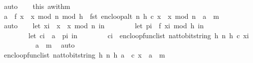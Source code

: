\begin{isabellebody}
\ auto\isanewline
\isanewline
\ \ \isamarkupfalse%
\ this\ a{\isacharunderscore}{\kern0pt}with{\isacharunderscore}{\kern0pt}m\ \isanewline
\ \ \isamarkupfalse%
\ {\isachardoublequoteopen}{\isacharquery}{\kern0pt}a{\isacharprime}{\kern0pt}\ {\isacharbrackleft}{\kern0pt}{\isasymoplus}{\isacharbrackright}{\kern0pt}\ {\isacharquery}{\kern0pt}f\ {\isacharparenleft}{\kern0pt}x\ {\isacharasterisk}{\kern0pt}\ x\ mod\ n\ mod\ {}{\isacharcircum}{\kern0pt}h{\isacharparenright}{\kern0pt}\ {\isacharhash}{\kern0pt}\ fst\ {\isacharparenleft}{\kern0pt}enc{\isacharunderscore}{\kern0pt}loop{\isacharunderscore}{\kern0pt}alt\ {\isacharparenleft}{\kern0pt}n{\isacharcomma}{\kern0pt}\ h{\isacharcomma}{\kern0pt}\ c{\isacharprime}{\kern0pt}{\isacharparenright}{\kern0pt}\ {\isacharparenleft}{\kern0pt}x\ {\isacharasterisk}{\kern0pt}\ x\ mod\ n{\isacharparenright}{\kern0pt}{\isacharparenright}{\kern0pt}\ {\isacharequal}{\kern0pt}\ a\ {\isacharhash}{\kern0pt}\ m{\isachardoublequoteclose}\isanewline
\ \ \ \ \isamarkupfalse%
\ auto\isanewline
\isanewline
\ \ \isamarkupfalse%
\ {\isachardoublequoteopen}{\isacharparenleft}{\kern0pt}let\ x{\isacharunderscore}{\kern0pt}i\ {\isacharequal}{\kern0pt}\ x\ {\isacharasterisk}{\kern0pt}\ x\ mod\ n\ in\isanewline
\ \ \ \ \ \ \ \ let\ p{\isacharunderscore}{\kern0pt}i\ {\isacharequal}{\kern0pt}\ {\isacharquery}{\kern0pt}f\ {\isacharparenleft}{\kern0pt}x{\isacharunderscore}{\kern0pt}i\ mod\ {}{\isacharcircum}{\kern0pt}h{\isacharparenright}{\kern0pt}\ in\isanewline
\ \ \ \ \ \ \ \ let\ c{\isacharunderscore}{\kern0pt}i\ {\isacharequal}{\kern0pt}\ {\isacharquery}{\kern0pt}a{\isacharprime}{\kern0pt}\ {\isacharbrackleft}{\kern0pt}{\isasymoplus}{\isacharbrackright}{\kern0pt}\ p{\isacharunderscore}{\kern0pt}i\ in\isanewline
\ \ \ \ \ \ \ \ c{\isacharunderscore}{\kern0pt}i\ {\isacharhash}{\kern0pt}\ enc{\isacharunderscore}{\kern0pt}loop{\isacharunderscore}{\kern0pt}func{\isacharunderscore}{\kern0pt}list\ {\isacharparenleft}{\kern0pt}nat{\isacharunderscore}{\kern0pt}to{\isacharunderscore}{\kern0pt}bitstring\ h{\isacharcomma}{\kern0pt}\ n{\isacharcomma}{\kern0pt}\ h{\isacharcomma}{\kern0pt}\ c{\isacharprime}{\kern0pt}{\isacharparenright}{\kern0pt}\ x{\isacharunderscore}{\kern0pt}i\isanewline
\ \ \ \ \ \ \ \ {\isacharparenright}{\kern0pt}\ {\isacharequal}{\kern0pt}\ a\ {\isacharhash}{\kern0pt}\ m{\isachardoublequoteclose}\ \isamarkupfalse%
\ auto\isanewline
\ \ \isamarkupfalse%
\ {\isachardoublequoteopen}enc{\isacharunderscore}{\kern0pt}loop{\isacharunderscore}{\kern0pt}func{\isacharunderscore}{\kern0pt}list\ {\isacharparenleft}{\kern0pt}nat{\isacharunderscore}{\kern0pt}to{\isacharunderscore}{\kern0pt}bitstring\ h{\isacharcomma}{\kern0pt}\ n{\isacharcomma}{\kern0pt}\ h{\isacharcomma}{\kern0pt}\ {\isacharquery}{\kern0pt}a{\isacharprime}{\kern0pt}\ {\isacharhash}{\kern0pt}\ c{\isacharprime}{\kern0pt}{\isacharparenright}{\kern0pt}\ x\ {\isacharequal}{\kern0pt}\ a\ {\isacharhash}{\kern0pt}\ m{\isachardoublequoteclose}\ \isamarkupfalse%

\end{isabellebody}
